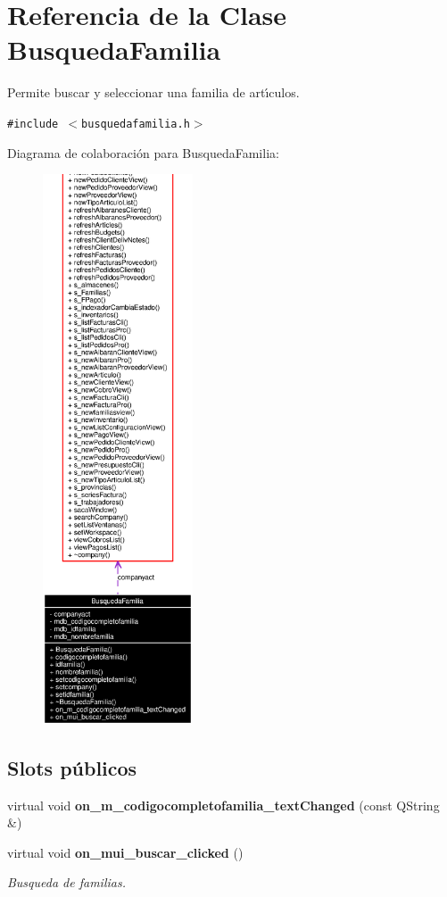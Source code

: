 \section{Referencia de la Clase Busqueda\-Familia}
\label{classBusquedaFamilia}
Permite buscar y seleccionar una familia de art\'{\i}culos.  


{\tt \#include $<$busquedafamilia.h$>$}

Diagrama de colaboraci\'{o}n para Busqueda\-Familia:\begin{figure}[H]
\begin{center}
\leavevmode
\includegraphics[width=126pt]{classBusquedaFamilia__coll__graph}
\end{center}
\end{figure}
\subsection*{Slots p\'{u}blicos}
\begin{CompactItemize}
\item 
virtual void {\bf on\_\-m\_\-codigocompletofamilia\_\-text\-Changed} (const QString \&)\label{classBusquedaFamilia_i0}

\item 
virtual void {\bf on\_\-mui\_\-buscar\_\-clicked} ()\label{classBusquedaFamilia_i1}

\begin{CompactList}\small\item\em Busqueda de familias. \item\end{CompactList}\end{CompactItemize}
